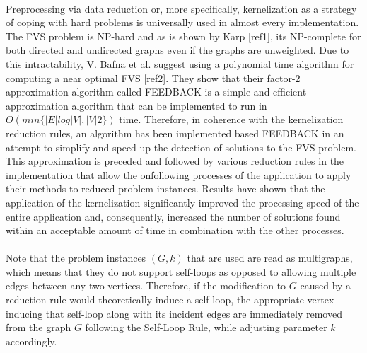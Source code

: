 \\
Preprocessing via data reduction or, more specifically, kernelization as a strategy of coping with hard problems is universally used in almost every implementation. The FVS problem is NP-hard and as is shown by Karp [ref1], its NP-complete for both directed and undirected graphs even if the graphs are unweighted. Due to this intractability, V. Bafna et al. suggest using a polynomial time algorithm for computing a near optimal FVS [ref2]. They show that their factor-2 approximation algorithm called \textsc{ FEEDBACK} is a simple and efficient approximation algorithm that can be implemented to run in $O(min\{|E| log |V |, |V |2\})$ time. Therefore, in coherence with the kernelization reduction rules, an algorithm has been implemented based \textsc{ FEEDBACK} in an attempt to simplify and speed up the detection of solutions to the FVS problem. This approximation is preceded and followed by various reduction rules in the implementation that allow the onfollowing processes of the application to apply their methods to reduced problem instances. Results have shown that the application of the kernelization significantly improved the processing speed of the entire application and, consequently, increased the number of solutions found within an acceptable amount of time in combination with the other processes. \\\\
Note that the problem instances $(G,k)$ that are used are read as multigraphs, which means that they do not support self-loops as opposed to allowing multiple edges between any two vertices. Therefore, if the modification to $G$ caused by a reduction rule would theoretically induce a self-loop, the appropriate vertex inducing that self-loop along with its incident edges are immediately removed from the graph $G$ following the Self-Loop Rule, while adjusting parameter $k$ accordingly.

